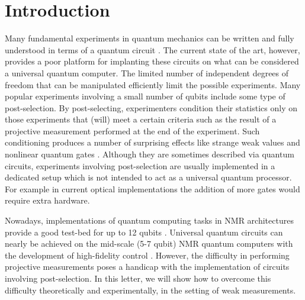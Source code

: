 \documentclass[aps,pra,12pt,onecolumn,showpacs,superscriptaddress,floatfix,footinbib,subfigure]{revtex4}
\begin{document}
\section{Introduction}
Many fundamental experiments in quantum mechanics can be written and fully understood in terms of a quantum circuit \cite{Deutsch1985}. The current state of the art, however,  provides a poor platform for implanting these circuits on what can be considered a universal quantum computer. The limited number of  independent degrees of freedom  that can be manipulated efficiently limit the possible experiments. Many popular experiments involving  a small number of qubits  include some type of  post-selection. By post-selecting,  experimenters  condition their statistics only on those experiments that (will) meet a certain criteria such as the result of a projective measurement performed at the end of the experiment. Such conditioning produces a number of surprising effects  like  strange weak values \cite{Aharonov1988} and nonlinear quantum gates \cite{Lloyd2011}. Although they are sometimes described via quantum circuits, experiments  involving post-selection are usually implemented in a dedicated setup  which is not intended to act as a universal quantum processor. For example in current optical implementations  \cite{Lundeen2006,Rozema2012} the addition of more gates would require extra hardware.

Nowadays, implementations of quantum computing tasks in NMR architectures provide a good test-bed for up to 12 qubits  \cite{Negrevergne2006}.  Universal quantum circuits can nearly be achieved on the mid-scale (5-7 qubit) NMR quantum computers with the development of high-fidelity control \cite{NMRRsoc}. However, the difficulty in performing  projective measurements poses a  handicap with the implementation of  circuits involving  post-selection. In this letter,  we will show how to overcome this  difficulty theoretically and experimentally, in the setting of weak measurements.
\end{document}
